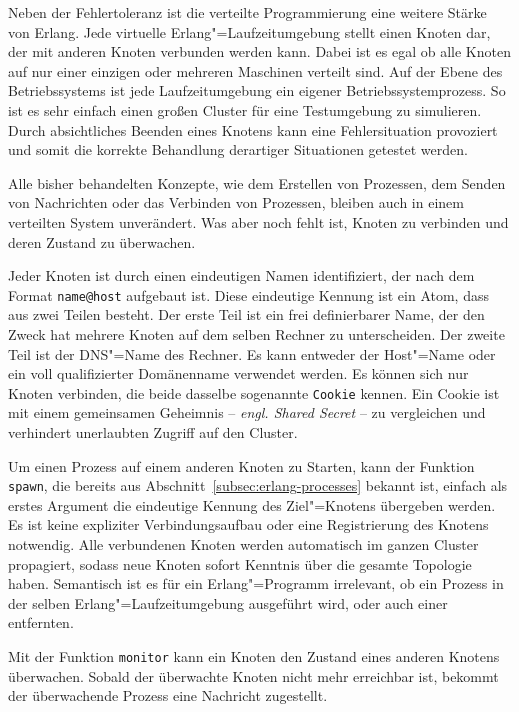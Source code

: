 Neben der Fehlertoleranz ist die verteilte Programmierung eine weitere Stärke von Erlang. Jede virtuelle Erlang"=Laufzeitumgebung stellt einen Knoten dar, der mit anderen Knoten verbunden werden kann. Dabei ist es egal ob alle Knoten auf nur einer einzigen oder mehreren Maschinen verteilt sind. Auf der Ebene des Betriebssystems ist jede Laufzeitumgebung ein eigener Betriebssystemprozess. So ist es sehr einfach einen großen Cluster für eine Testumgebung zu simulieren. Durch absichtliches Beenden eines Knotens kann eine Fehlersituation provoziert und somit die korrekte Behandlung derartiger Situationen getestet werden.

Alle bisher behandelten Konzepte, wie dem Erstellen von Prozessen, dem Senden von Nachrichten oder das Verbinden von Prozessen, bleiben auch in einem verteilten System unverändert. Was aber noch fehlt ist, Knoten zu verbinden und deren Zustand zu überwachen.

Jeder Knoten ist durch einen eindeutigen Namen identifiziert, der nach dem Format \lstinline{name@host} aufgebaut ist. Diese eindeutige Kennung ist ein Atom, dass aus zwei Teilen besteht. Der erste Teil ist ein frei definierbarer Name, der den Zweck hat mehrere Knoten auf dem selben Rechner zu unterscheiden. Der zweite Teil ist der DNS"=Name des Rechner. Es kann entweder der Host"=Name oder ein voll qualifizierter Domänenname verwendet werden. Es können sich nur Knoten verbinden, die beide dasselbe sogenannte \lstinline{Cookie} kennen. Ein Cookie ist mit einem gemeinsamen Geheimnis -- \textit{engl. Shared Secret} -- zu vergleichen und verhindert unerlaubten Zugriff auf den Cluster.

Um einen Prozess auf einem anderen Knoten zu Starten, kann der Funktion \lstinline{spawn}, die bereits aus Abschnitt~\ref{subsec:erlang-processes} bekannt ist, einfach als erstes Argument die eindeutige Kennung des Ziel"=Knotens übergeben werden. Es ist keine expliziter Verbindungsaufbau oder eine Registrierung des Knotens notwendig. Alle verbundenen Knoten werden automatisch im ganzen Cluster propagiert, sodass neue Knoten sofort Kenntnis über die gesamte Topologie haben. Semantisch ist es für ein Erlang"=Programm irrelevant, ob ein Prozess in der selben Erlang"=Laufzeitumgebung ausgeführt wird, oder auch einer entfernten.

Mit der Funktion \lstinline{monitor} kann ein Knoten den Zustand eines anderen Knotens überwachen. Sobald der überwachte Knoten nicht mehr erreichbar ist, bekommt der überwachende Prozess eine Nachricht zugestellt.

